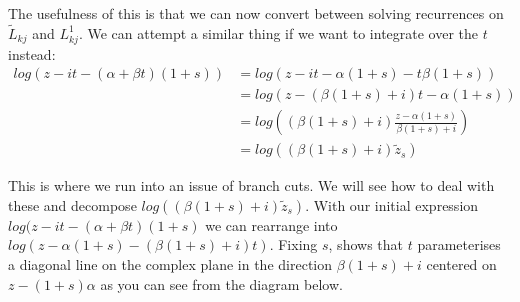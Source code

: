 \documentclass{article}
\begin{document}
The usefulness of this is that we can now convert between solving recurrences on $\tilde L_{kj}$ and $L_{kj}^1$.
We can attempt a similar thing if we want to integrate over the $t$ instead:
\begin{align}
    log(z-it-(\alpha+\beta t)(1+s))&=log(z-it-\alpha(1+s)-t\beta(1+s))\\
    &=log(z-(\beta(1+s)+i)t-\alpha(1+s))\\
    &=log((\beta(1+s)+i)\frac{z-\alpha(1+s)}{\beta(1+s)+i})\\
    &=log((\beta(1+s)+i)\tilde{z}_s)
\end{align}

This is where we run into an issue of branch cuts.
We will see how to deal with these and decompose $log((\beta(1+s)+i)\tilde{z}_s)$.
With our initial expression $log(z-it-(\alpha+\beta t)(1+s)$ we can rearrange into $log(z-\alpha(1+s)-(\beta (1+s)+i)t)$.
Fixing $s$, shows that $t$ parameterises a diagonal line on the complex plane in the direction $\beta(1+s)+i$ centered on $z-(1+s)\alpha$ as you can see from the diagram below.
\end{document}
